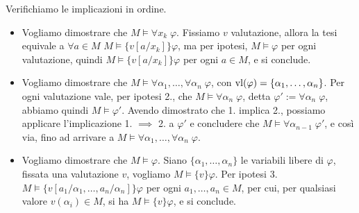 \begin{soln}
    Verifichiamo le implicazioni in ordine.
    \begin{itemize}
        \item[$\boxed{1. \implies 2.}$] Vogliamo dimostrare che $M \models \forall x_k \; \varphi$. Fissiamo $v$ valutazione, allora la tesi equivale a $\forall a \in M$ $M \models \{v[a/x_k]\} \varphi$, ma per ipotesi, $M \models \varphi$ per ogni valutazione, quindi $M \models \{v[a/x_k]\} \varphi$ per ogni $a \in M$, e si conclude.
        \item[$\boxed{2. \implies 3.}$] Vogliamo dimostrare che $M \models \forall \alpha_1, \ldots, \forall \alpha_n \; \varphi$, con $\operatorname{vl}(\varphi) = \{\alpha_1,\ldots,\alpha_n\}$. Per ogni valutazione vale, per ipotesi 2., che $M \models \forall \alpha_n \; \varphi$, detta $\varphi' := \forall \alpha_n \; \varphi$, abbiamo quindi $M \models \varphi'$. Avendo dimostrato che 1. implica 2., possiamo applicare l'implicazione 1. $\implies$ 2. a $\varphi'$ e concludere che $M \models \forall \alpha_{n-1} \; \varphi'$, e così via, fino ad arrivare a $M \models \forall \alpha_1, \ldots, \forall \alpha_n \; \varphi$.
        \item[$\boxed{3. \implies 1.}$] Vogliamo dimostrare che $M \models \varphi$. Siano $\{\alpha_1,\ldots,\alpha_n\}$ le variabili libere di $\varphi$, fissata una valutazione $v$, vogliamo $M \models \{v\} \varphi$. Per ipotesi 3. $M \models\{v[a_1/\alpha_1,\ldots,a_n/\alpha_n]\} \varphi$ per ogni $a_1,\ldots,a_n \in M$, per cui, per qualsiasi valore $v(\alpha_i) \in M$, si ha $M \models \{v\} \varphi$, e si conclude.
    \end{itemize}
\end{soln}

